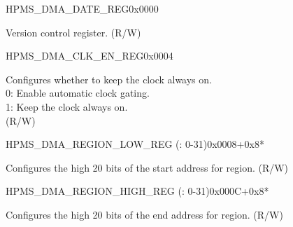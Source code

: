 \begin{register}{H}{PMS\_DMA\_DATE\_REG}{0x0000}\label{regdesc:PMSDMADATEREG}
%
\regnewline%
\begin{regdesc}\begin{reglist}
\label{fielddesc:PMSDMADATE}\item [PMS\_DMA\_DATE] Version control register. (R/W)
\end{reglist}\end{regdesc}
\end{register}


\begin{register}{H}{PMS\_DMA\_CLK\_EN\_REG}{0x0004}\label{regdesc:PMSDMACLKENREG}
%
%
\regnewline%
\begin{regdesc}\begin{reglist}
\label{fielddesc:PMSDMACLKEN}\item [PMS\_DMA\_CLK\_EN] Configures whether to keep the clock always on.\\
0: Enable automatic clock gating.\\
1: Keep the clock always on.\\ (R/W)
\end{reglist}\end{regdesc}
\end{register}


\begin{register}{H}{PMS\_DMA\_REGION\_LOW\_REG (: 0-31)}{0x0008+0x8*}\label{regdesc:PMSDMAREGIONNLOWREG}
%
%
\regnewline%
\begin{regdesc}\begin{reglist}
\label{fielddesc:PMSDMAREGIONNLOW}\item [PMS\_DMA\_REGION\regindex{n}\_LOW] Configures the high 20 bits of the start address for region. (R/W)
\end{reglist}\end{regdesc}
\end{register}


\begin{register}{H}{PMS\_DMA\_REGION\_HIGH\_REG (: 0-31)}{0x000C+0x8*}\label{regdesc:PMSDMAREGIONNHIGHREG}
%
%
\regnewline%
\begin{regdesc}\begin{reglist}
\label{fielddesc:PMSDMAREGIONNHIGH}\item [PMS\_DMA\_REGION\regindex{n}\_HIGH] Configures the high 20 bits of the end address for region. (R/W)
\end{reglist}\end{regdesc}
\end{register}



